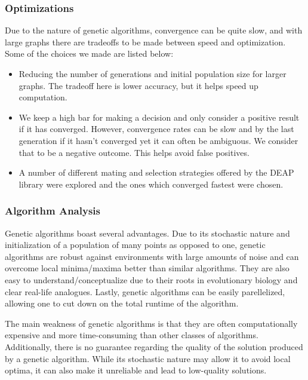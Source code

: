 \documentclass[acmlarge]{acmart}
\begin{document}
\subsubsection{Optimizations}
Due to the nature of genetic algorithms, convergence can be quite slow, and with large graphs there are tradeoffs to be made between speed and optimization. Some of the choices we made are listed below:

\begin{itemize}[topsep=\parskip]
  \item Reducing the number of generations and initial population size for larger graphs. The tradeoff here is lower accuracy, but it helps speed up computation.
  \item We keep a high bar for making a decision and only consider a positive result if it has converged. However, convergence rates can be slow and by the last generation if it hasn’t converged yet it can often be ambiguous. We consider that to be a negative outcome. This helps avoid false positives.
  \item A number of different mating and selection strategies offered by the DEAP library were explored and the ones which converged fastest were chosen.
\end{itemize}

\subsubsection{Algorithm Analysis}
Genetic algorithms boast several advantages. Due to its stochastic nature and initialization of a population of many points as opposed to one, genetic algorithms are robust against environments with large amounts of noise and can overcome local minima/maxima better than similar algorithms. They are also easy to understand/conceptualize due to their roots in evolutionary biology and clear real-life analogues. Lastly, genetic algorithms can be easily parellelized, allowing one to cut down on the total runtime of the algorithm.

The main weakness of genetic algorithms is that they are often computationally expensive and more time-consuming than other classes of algorithms. Additionally, there is no guarantee regarding the quality of the solution produced by a genetic algorithm. While its stochastic nature may allow it to avoid local optima, it can also make it unreliable and lead to low-quality solutions.
\end{document}
